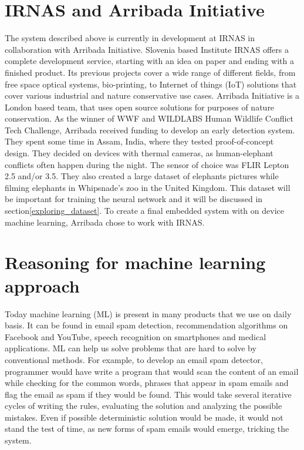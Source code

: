 \section{ IRNAS and Arribada Initiative}\label{arribada_init}

The system described above is currently in development at IRNAS in collaboration with Arribada Initiative.
Slovenia based Institute IRNAS offers a complete development service, starting with an idea on paper and ending with a finished product. 
Its previous projects cover a wide range of different fields, from free space optical systems, bio-printing, to Internet of things (IoT) solutions that cover various industrial and nature conservative use cases.
Arribada Initiative is a London based team, that uses open source solutions for purposes of nature conservation.
As the winner of WWF and WILDLABS Human Wildlife Conflict Tech Challenge\cite{wildlabs-winners}, Arribada received funding to develop an early detection system.
They spent some time in Assam, India, where they tested proof-of-concept design\cite{arribada-assam}.
They decided on devices with thermal cameras, as human-elephant conflicts often happen during the night.
The sensor of choice was FLIR Lepton 2.5 and/or 3.5.
They also created a large dataset of elephants pictures while filming elephants in Whipsnade's zoo in the United Kingdom. 
This dataset will be important for training the neural network and it will be discussed in section\ref{exploring_dataset}.
To create a final embedded system with on device machine learning, Arribada chose to work with IRNAS.


\section{ Reasoning for machine learning approach}

Today machine learning (ML) is present in many products that we use on daily basis.
It can be found in email spam detection, recommendation algorithms on Facebook and YouTube, speech recognition on smartphones and medical applications.
ML can help us solve problems that are hard to solve by conventional methods.
For example, to develop an email spam detector, programmer would have write a program that would scan the content of an email while checking for the common words, phrases that appear in spam emails and flag the email as spam if they would be found.
This would take several iterative cycles of writing the rules, evaluating the solution and analyzing the possible mistakes. 
Even if possible deterministic solution would be made, it would not stand the test of time, as new forms of spam emails would emerge, tricking the system.


